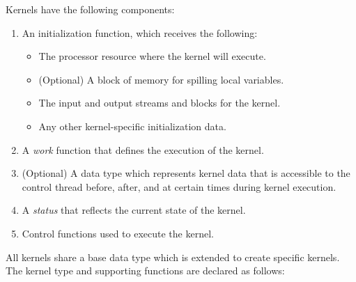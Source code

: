 Kernels have the following components:

\begin{enumerate}

\item An initialization function, which receives the following: 
\begin{itemize}
\item The processor resource where the kernel will execute. 
\item (Optional) A block of memory for spilling local variables. 
\item The input and output streams and blocks for the kernel. 
\item Any other kernel-specific initialization data. 
\end{itemize}

\item A {\it work} function that defines the execution of the kernel.

\item (Optional) A data type which represents kernel data that is accessible to the control thread before, after, and at certain times during kernel execution.

\item A {\it status} that reflects the current state of the kernel.

\item Control functions used to execute the kernel.

\end{enumerate}


All kernels share a base data type which is extended to 
create specific kernels. The kernel type and 
supporting functions are declared as follows:

